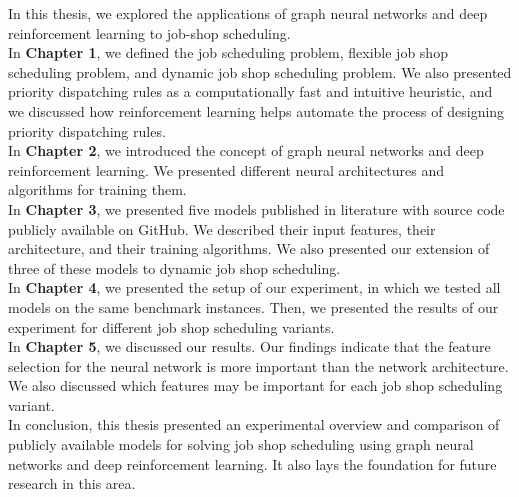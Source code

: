 

In this thesis, we explored the applications of graph neural networks and deep reinforcement learning to job-shop scheduling.\\
In \textbf{Chapter 1}, we defined the job scheduling problem, flexible job shop scheduling problem, and dynamic job shop scheduling problem. We also presented priority dispatching rules as a computationally fast and intuitive heuristic, and we discussed how reinforcement learning helps automate the process of designing priority dispatching rules.\\
In \textbf{Chapter 2}, we introduced the concept of graph neural networks and deep reinforcement learning. We presented different neural architectures and algorithms for training them.\\
In \textbf{Chapter 3}, we presented five models published in literature with source code publicly available on GitHub. We described their input features, their architecture, and their training algorithms. We also presented our extension of three of these models to dynamic job shop scheduling.\\
In \textbf{Chapter 4}, we presented the setup of our experiment, in which we tested all models on the same benchmark instances. Then, we presented the results of our experiment for different job shop scheduling variants.\\
In \textbf{Chapter 5}, we discussed our results. Our findings indicate that the feature selection for the neural network is more important than the network architecture. We also discussed which features may be important for each job shop scheduling variant.\\
In conclusion, this thesis presented an experimental overview and comparison of publicly available models for solving job shop scheduling using graph neural networks and deep reinforcement learning. It also lays the foundation for future research in this area.